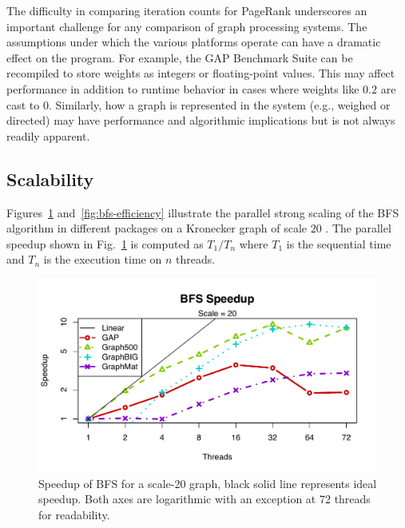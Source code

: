 \documentclass[conference]{IEEEtran}
\begin{document}
The difficulty in comparing iteration counts for PageRank underscores an important challenge for any comparison of graph processing systems. The assumptions under which the various platforms operate can have a dramatic effect on the program. For example, the GAP Benchmark Suite can be recompiled to store weights as integers or floating-point values. This may affect performance in addition to runtime behavior in cases where weights like $0.2$ are cast to $0$. Similarly, how a graph is represented in the system (e.g., weighed or directed) may have performance and algorithmic implications but is not always readily apparent.

\subsection{Scalability}
Figures~\ref{fig:bfs-speedup} and~\ref{fig:bfs-efficiency} illustrate the parallel strong scaling of the BFS algorithm in different packages on a Kronecker graph of scale $20$ . The parallel speedup shown in Fig.~\ref{fig:bfs-speedup} is computed as $T_1 / T_n$ where $T_1$ is the sequential time and $T_n$ is the execution time on $n$ threads. 
\begin{figure}[htb]
	\centering
		\includegraphics[width=\linewidth, trim=0 18pt 18pt 12pt, clip]{graphics/bfs_speedup20.pdf}
		\caption{Speedup of BFS for a scale-20 graph, black solid line represents ideal speedup. Both axes are logarithmic with an exception at 72 threads for readability. }
	\label{fig:bfs-speedup}
\end{figure}
\end{document}
